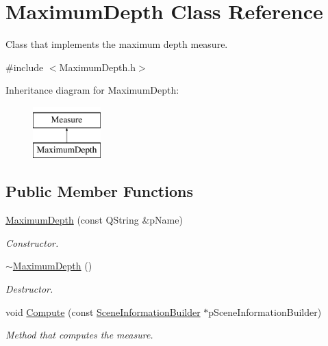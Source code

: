\hypertarget{class_maximum_depth}{\section{Maximum\+Depth Class Reference}
\label{class_maximum_depth}
}


Class that implements the maximum depth measure.  




{\ttfamily \#include $<$Maximum\+Depth.\+h$>$}

Inheritance diagram for Maximum\+Depth\+:\begin{figure}[H]
\begin{center}
\leavevmode
\includegraphics[height=2.000000cm]{class_maximum_depth}
\end{center}
\end{figure}
\subsection*{Public Member Functions}
\begin{DoxyCompactItemize}
\item 
\hyperlink{class_maximum_depth_a5b834b95fd69eecd2948d82aedd81048}{Maximum\+Depth} (const Q\+String \&p\+Name)
\begin{DoxyCompactList}\small\item\em Constructor. \end{DoxyCompactList}\item 
\hyperlink{class_maximum_depth_aea25a2b62c351d4df6ef3980600cb226}{$\sim$\+Maximum\+Depth} ()
\begin{DoxyCompactList}\small\item\em Destructor. \end{DoxyCompactList}\item 
void \hyperlink{class_maximum_depth_af661fc2162ca4af043a6bfcf4fa68873}{Compute} (const \hyperlink{class_scene_information_builder}{Scene\+Information\+Builder} $\ast$p\+Scene\+Information\+Builder)
\begin{DoxyCompactList}\small\item\em Method that computes the measure. \end{DoxyCompactList}\end{DoxyCompactItemize}
